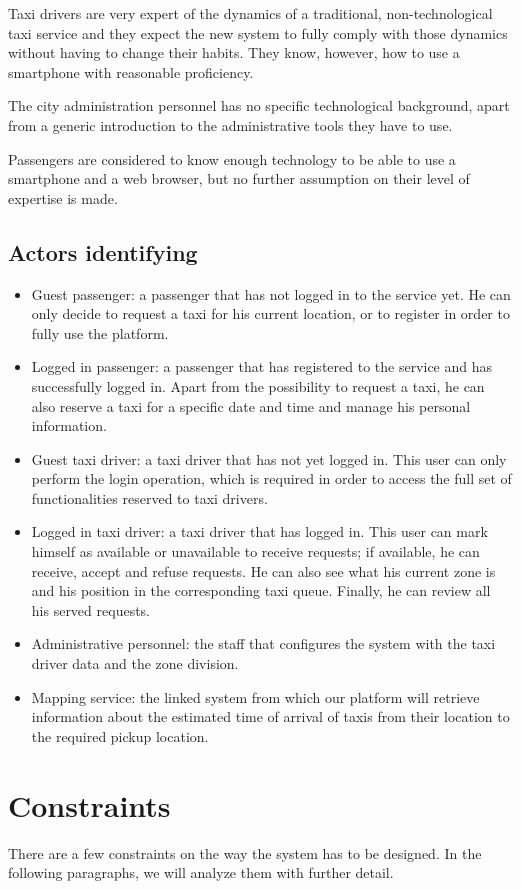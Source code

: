 Taxi drivers are very expert of the dynamics of a traditional, non-technological taxi service and they expect the new system to fully comply with those dynamics without having to change their habits. They know, however, how to use a smartphone with reasonable proficiency.

The city administration personnel has no specific technological background, apart from a generic introduction to the administrative tools they have to use.

Passengers are considered to know enough technology to be able to use a smartphone and a web browser, but no further assumption on their level of expertise is made. 


\subsection{Actors identifying}
\begin{itemize}
\item Guest passenger: a passenger that has not logged in to the service yet. He can only decide to request a taxi for his current location, or to register in order to fully use the platform. 
\item Logged in passenger: a passenger that has registered to the service and has successfully logged in. Apart from the possibility to request a taxi, he can also reserve a taxi for a specific date and time and manage his personal information.
\item Guest taxi driver: a taxi driver that has not yet logged in. This user can only perform the login operation, which is required in order to access the full set of functionalities reserved to taxi drivers. 
\item Logged in taxi driver: a taxi driver that has logged in. This user can mark himself as available or unavailable to receive requests; if available, he can receive, accept and refuse requests. He can also see what his current zone is and his position in the corresponding taxi queue. Finally, he can review all his served requests.
\item Administrative personnel: the staff that configures the system with the taxi driver data and the zone division. 
\item Mapping service: the linked system from which our platform will retrieve information about the estimated time of arrival of taxis from their location to the required pickup location.
\end{itemize}


\section{Constraints}
There are a few constraints on the way the system has to be designed. In the following paragraphs, we will analyze them with further detail.


